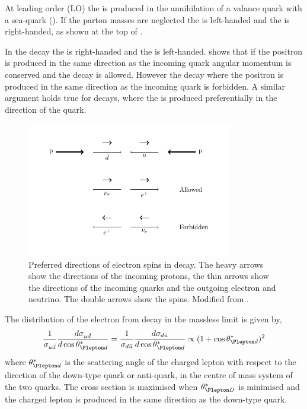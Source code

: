 At leading order (LO) the \PWp is produced in the annihilation of a \Pup valance quark
with a \APdown sea-quark (). 
If the parton masses are neglected the \Pup is left-handed and the \APdown is
right-handed, as shown at the top of . 

In the \PWp decay the \Ppositron is right-handed and the \Pnue is left-handed.
 shows that if the  positron is produced in the same direction
as the incoming \APdown quark angular momentum is conserved and the decay is
allowed.
However the decay where the positron is produced in the same direction as the
incoming \Pup quark is forbidden.
A similar argument holds true for \PWm decays, where the \Pelectron is produced
preferentially in the direction of the \Pdown quark.

\begin{figure}[htbp]
  \centering
  \includegraphics[width=0.8\textwidth]{w_decay_directions}
  \caption[Preferred directions of electron spins in
\HepProcess{\PWplus\to\APelectron\Pnue} decay.] {Preferred directions of
electron spins in \HepProcess{\PWplus\to\APelectron\Pnue} decay.  The heavy
arrows show the directions of the incoming protons, the thin arrows show the
directions of the incoming quarks and the outgoing electron and neutrino. The
double arrows show the spins.  Modified from \cite{aitchison2004gauge}. }
  \label{wbos:wspin}
\end{figure}

The distribution of the electron from \PWpm decay in the massless limit
is given by\cite{perkins2000introduction,aitchison2004gauge},
\begin{equation}
  \frac{1}{\sigma_{u\bar{d}}}
  \frac{d \sigma_{u\bar{d}}}{d \cos \theta_{\Plepton d}^{\ast}}
  =
  \frac{1}{\sigma_{d\bar{u}}}
  \frac{d \sigma_{d\bar{u}}}{d \cos \theta_{\Plepton d}^{\ast}}
  \propto
  (1+\cos \theta_{\Plepton d}^{\ast})^2
  \label{wbos:lepton}
\end{equation}
where $\theta_{\Plepton d}^{\ast}$ is the scattering angle of the charged
lepton with respect to the direction of the down-type quark or anti-quark, in
the centre of mass system of the two quarks. The cross section is maximised when
$\theta_{\Plepton D}^{\ast}$ is minimised and the charged lepton is produced in
the same direction as the down-type quark.


